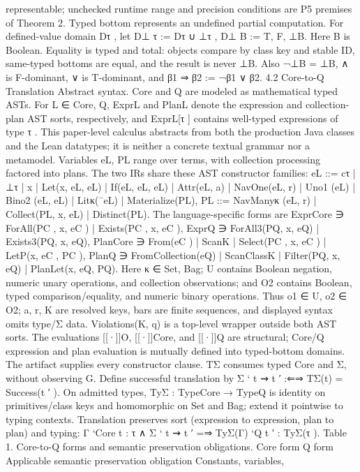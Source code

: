 representable; unchecked runtime range and precision conditions are P5 premises of
Theorem 2.
Typed bottom represents an undefined partial computation. For defined-value domain Dτ , let
D⊥
τ
:= Dτ ∪ {⊥τ }, D⊥
B := {T, F, ⊥B}.
Here B is Boolean. Equality is typed and total: objects compare by class key and stable
ID, same-typed bottoms are equal, and the result is never ⊥B. Also ¬⊥B = ⊥B, ∧ is
F-dominant, ∨ is T-dominant, and β1 ⇒ β2 := ¬β1 ∨ β2.
4.2 Core-to-Q Translation
Abstract syntax. Core and Q are modeled as mathematical typed ASTs. For L ∈
{Core, Q}, ExprL and PlanL denote the expression and collection-plan AST sorts,
respectively, and ExprL[τ ] contains well-typed expressions of type τ . This paper-level
calculus abstracts from both the production Java classes and the Lean datatypes; it is
neither a concrete textual grammar nor a metamodel. Variables eL, PL range over terms,
with collection processing factored into plans. The two IRs share these AST constructor
families:
eL ::= cτ | ⊥τ | x | Let(x, eL, eL) | If(eL, eL, eL)
| Attr(eL, a) | NavOne(eL, r) | Uno1
(eL) | Bino2
(eL, eL)
| Litκ(¯eL) | Materialize(PL),
PL ::= NavManyκ
(eL, r) | Collect(PL, x, eL) | Distinct(PL).
The language-specific forms are
ExprCore ∋ ForAll(PC , x, eC ) | Exists(PC , x, eC ),
ExprQ ∋ ForAll3(PQ, x, eQ) | Exists3(PQ, x, eQ),
PlanCore ∋ From(eC ) | ScanK | Select(PC , x, eC ) | LetP(x, eC , PC ),
PlanQ ∋ FromCollection(eQ) | ScanClassK | Filter(PQ, x, eQ) | PlanLet(x, eQ, PQ).
Here κ ∈ {Set, Bag}; U contains Boolean negation, numeric unary operations, and
collection observations; and O2 contains Boolean, typed comparison/equality, and numeric binary operations. Thus o1 ∈ U, o2 ∈ O2; a, r, K are resolved keys, bars are
finite sequences, and displayed syntax omits type/Σ data. Violations(K, q) is a top-level
wrapper outside both AST sorts.
The evaluations [[·]]O, [[·]]Core, and [[·]]Q are structural; Core/Q expression and plan
evaluation is mutually defined into typed-bottom domains. The artifact supplies every
constructor clause.
TΣ consumes typed Core and Σ, without observing G. Define successful translation
by
Σ ` t ⇝ t
′
:⇐⇒ TΣ(t) = Success(t
′
).
On admitted types, TyΣ : TypeCore → TypeQ is identity on primitives/class keys
and homomorphic on Set and Bag; extend it pointwise to typing contexts. Translation
preserves sort (expression to expression, plan to plan) and typing:
Γ `Core t : τ ∧ Σ ` t ⇝ t
′ =⇒ TyΣ(Γ) `Q t
′
: TyΣ(τ ).
Table 1. Core-to-Q forms and semantic preservation obligations.
Core form Q form Applicable semantic preservation obligation
Constants, variables,
